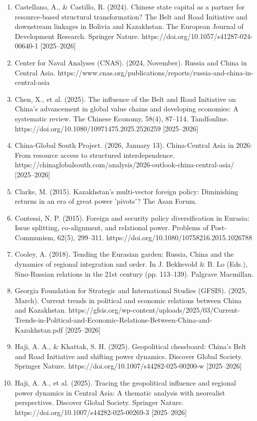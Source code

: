 \documentclass[12pt]{article}
\begin{document}
\begin{enumerate}[leftmargin=*]
\item Castellano, A., \& Castillo, R. (2024). Chinese state capital as a partner for resource-based structural transformation? The Belt and Road Initiative and downstream linkages in Bolivia and Kazakhstan. The European Journal of Development Research. Springer Nature. https://doi.org/10.1057/s41287-024-00640-1 [2025–2026]
\item Center for Naval Analyses (CNAS). (2024, November). Russia and China in Central Asia. https://www.cnas.org/publications/reports/russia-and-china-in-central-asia
\item Chen, X., et al. (2025). The influence of the Belt and Road Initiative on China's advancement in global value chains and developing economies: A systematic review. The Chinese Economy, 58(4), 87–114. Tandfonline. https://doi.org/10.1080/10971475.2025.2526259 [2025–2026]
\item China-Global South Project. (2026, January 13). China-Central Asia in 2026: From resource access to structured interdependence. https://chinaglobalsouth.com/analysis/2026-outlook-china-central-asia/ [2025–2026]
\item Clarke, M. (2015). Kazakhstan's multi-vector foreign policy: Diminishing returns in an era of great power 'pivots'? The Asan Forum.
\item Contessi, N. P. (2015). Foreign and security policy diversification in Eurasia: Issue splitting, co-alignment, and relational power. Problems of Post-Communism, 62(5), 299–311. https://doi.org/10.1080/10758216.2015.1026788
\item Cooley, A. (2018). Tending the Eurasian garden: Russia, China and the dynamics of regional integration and order. In J. Bekkevold \& B. Lo (Eds.), Sino-Russian relations in the 21st century (pp. 113–139). Palgrave Macmillan.
\item Georgia Foundation for Strategic and International Studies (GFSIS). (2025, March). Current trends in political and economic relations between China and Kazakhstan. https://gfsis.org/wp-content/uploads/2025/03/Current-Trends-in-Political-and-Economic-Relations-Between-China-and-Kazakhstan.pdf [2025–2026]
\item Haji, A. A., \& Khattak, S. H. (2025). Geopolitical chessboard: China's Belt and Road Initiative and shifting power dynamics. Discover Global Society. Springer Nature. https://doi.org/10.1007/s44282-025-00200-w [2025–2026]
\item Haji, A. A., et al. (2025). Tracing the geopolitical influence and regional power dynamics in Central Asia: A thematic analysis with neorealist perspectives. Discover Global Society. Springer Nature. https://doi.org/10.1007/s44282-025-00269-3 [2025–2026]

\end{enumerate}
\end{document}
